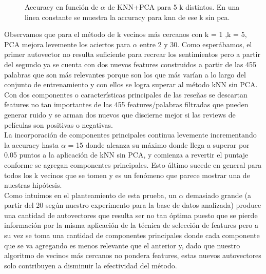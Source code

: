 \begin{figure}[H]
\caption{Accuracy en función de $\alpha$ de KNN+PCA para 5 k distintos. 
En una linea constante se muestra la accuracy para knn de ese k sin pca.}
\label{fig:exp5-acc-100}
\end{figure}

Observamos que para el método de k vecinos más cercanos con k = 1 ,k = 5, PCA mejora levemente los aciertos para $\alpha$ entre 2 y 30. Como esperábamos, el primer autovector no resulta suficiente para recrear los sentimientos pero a partir del segundo ya se cuenta con dos nuevos features construidos a partir de las 455 palabras que son más relevantes porque son los que más varían a lo largo del conjunto de entrenamiento y con ellos se logra superar al método kNN sin PCA.\\

Con dos componentes o características principales de las reseñas se descartan features no tan importantes de las 455 features/palabras filtradas que pueden generar ruido y se arman dos nuevos que discierne mejor si las reviews de películas son positivas o negativas. \\
La incorporación de componentes principales continua levemente incrementando la accuracy hasta $\alpha$ = 15 donde alcanza su máximo donde llega a superar por 0.05 puntos a la aplicación de kNN sin PCA, y comienza a revertir el puntaje conforme se agregan componentes principales. Esto último sucede en general para todos los k vecinos que se tomen y es un fenómeno que parece mostrar una de nuestras hipótesis.\\

Como intuimos en el planteamiento de esta prueba, un $\alpha$ demasiado grande (a partir del 20 según nuestro experimento para la base de datos analizada) produce una cantidad de autovectores que resulta ser no tan óptima puesto que se pierde información por la misma aplicación de la técnica de selección de features pero a su vez se toma una cantidad de componentes principales donde cada componente que se va agregando es menos relevante que el anterior y, dado que nuestro algoritmo de vecinos más cercanos no pondera features, estas nuevos autovectores solo contribuyen a disminuir la efectividad del método. \\

